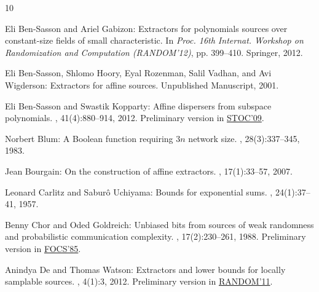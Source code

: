 \tocrefpdfbookmark
\begin{thebibliography}{10}

{\sc Eli {Ben-Sasson} and Ariel Gabizon}: Extractors for polynomials sources
  over constant-size fields of small characteristic.
\newblock In {\em Proc. 16th Internat. Workshop on Randomization and
  Computation (RANDOM'12)}, pp. 399--410. Springer, 2012.
\newblock [\epfmtdoi{10.1007/978-3-642-32512-0\_34}]

{\sc Eli {Ben-Sasson}, Shlomo Hoory, Eyal Rozenman, Salil Vadhan, and Avi
  Wigderson}: Extractors for affine sources.
\newblock Unpublished Manuscript, 2001.

{\sc Eli {Ben-Sasson} and Swastik Kopparty}: Affine dispersers from subspace
  polynomials.
, 41(4):880--914, 2012.
\newblock Preliminary version in
  \href{http://dx.doi.org/10.1145/1536414.1536426}{STOC'09}.
\newblock [\epfmtdoi{10.1137/110826254}]

{\sc Norbert Blum}: A {B}oolean function requiring $3n$ network size.
, 28(3):337--345, 1983.
\newblock [\epfmtdoi{10.1016/0304-3975(83)90029-4}]

{\sc Jean Bourgain}: On the construction of affine extractors.
, 17(1):33--57, 2007.
\newblock [\epfmtdoi{10.1007/s00039-007-0593-z}]

{\sc Leonard Carlitz and Sabur{\^o} Uchiyama}: Bounds for exponential sums.
, 24(1):37--41, 1957.
\newblock [\epfmtdoi{10.1215/S0012-7094-57-02406-7}]

{\sc Benny Chor and Oded Goldreich}: Unbiased bits from sources of weak
  randomness and probabilistic communication complexity.
, 17(2):230--261, 1988.
\newblock Preliminary version in
  \href{http://dx.doi.org/10.1109/SFCS.1985.62}{FOCS'85}.
\newblock [\epfmtdoi{10.1137/0217015}]

{\sc Anindya De and Thomas Watson}: Extractors and lower bounds for locally
  samplable sources.
, 4(1):3, 2012.
\newblock Preliminary version in
  \href{http://dx.doi.org/10.1007/978-3-642-22935-0_41}{RANDOM'11}.
\newblock [\epfmtdoi{10.1145/2141938.2141941}]


\end{thebibliography}
